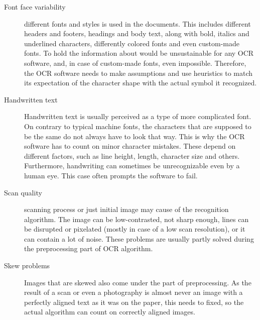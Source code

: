 \begin{description}
\item[Font face variability]  different fonts and styles is used in the documents. This includes different headers and footers, headings and body text, along with bold, italics and underlined characters,  differently colored fonts and even custom-made fonts. To hold the information about  would be unsustainable for any OCR software, and, in case of custom-made fonts, even impossible. Therefore, the OCR software needs to make assumptions  and use heuristics to match its expectation of the character shape with the actual symbol it recognized.
\item[Handwritten text] Handwritten text is usually perceived as a type of more complicated font. On contrary to typical machine fonts, the characters that are supposed to be the same do not always have to look that way. This is why the OCR software has to count on minor character mistakes. These depend on different factors, such as line height, length, character size and others. Furthermore, handwriting can sometimes be unrecognizable even by a human eye. This case often prompts the software to fail.
\item[Scan quality]  scanning process or just  initial image may cause  of the recognition algorithm. The image can be low-contrasted, not sharp enough, lines can be disrupted or pixelated (mostly in case of a low scan resolution), or it can contain a lot of noise. These problems are usually partly solved during the preprocessing part of OCR algorithm.
\item[Skew problems] Images that are skewed also come under the part of preprocessing. As the result of a scan or even a photography is almost never an image with a perfectly aligned text as it was on the paper, this needs to fixed, so the actual algorithm can count on correctly aligned images.

\end{description}

